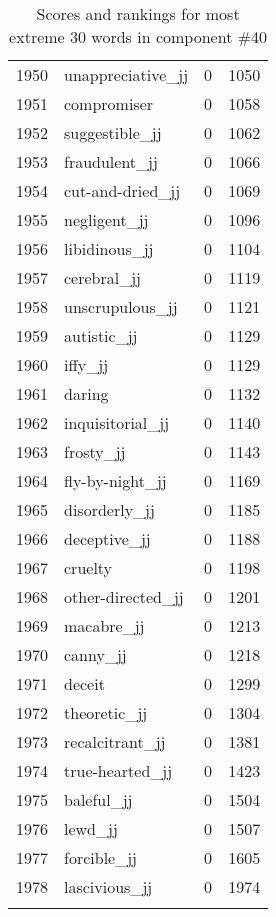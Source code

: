 \begin{longtable}[!htbp]{| rlr@{.}l |}
    1950 & unappreciative\_jj & 0 & 1050 \\
    1951 & compromiser & 0 & 1058 \\
    1952 & suggestible\_jj & 0 & 1062 \\
    1953 & fraudulent\_jj & 0 & 1066 \\
    1954 & cut-and-dried\_jj & 0 & 1069 \\
    1955 & negligent\_jj & 0 & 1096 \\
    1956 & libidinous\_jj & 0 & 1104 \\
    1957 & cerebral\_jj & 0 & 1119 \\
    1958 & unscrupulous\_jj & 0 & 1121 \\
    1959 & autistic\_jj & 0 & 1129 \\
    1960 & iffy\_jj & 0 & 1129 \\
    1961 & daring & 0 & 1132 \\
    1962 & inquisitorial\_jj & 0 & 1140 \\
    1963 & frosty\_jj & 0 & 1143 \\
    1964 & fly-by-night\_jj & 0 & 1169 \\
    1965 & disorderly\_jj & 0 & 1185 \\
    1966 & deceptive\_jj & 0 & 1188 \\
    1967 & cruelty & 0 & 1198 \\
    1968 & other-directed\_jj & 0 & 1201 \\
    1969 & macabre\_jj & 0 & 1213 \\
    1970 & canny\_jj & 0 & 1218 \\
    1971 & deceit & 0 & 1299 \\
    1972 & theoretic\_jj & 0 & 1304 \\
    1973 & recalcitrant\_jj & 0 & 1381 \\
    1974 & true-hearted\_jj & 0 & 1423 \\
    1975 & baleful\_jj & 0 & 1504 \\
    1976 & lewd\_jj & 0 & 1507 \\
    1977 & forcible\_jj & 0 & 1605 \\
    1978 & lascivious\_jj & 0 & 1974 \\
    \hline
    \caption{Scores and rankings for most extreme 30 words in component \#40} \\
\end{longtable}
